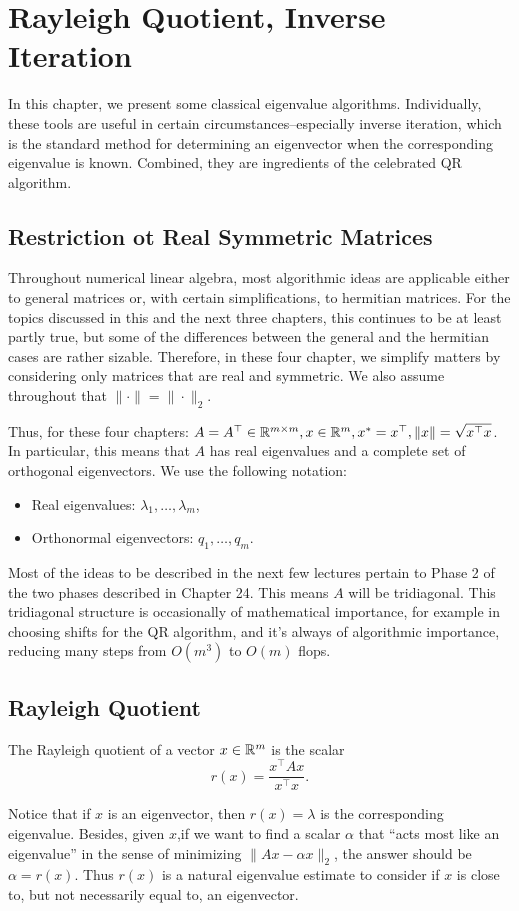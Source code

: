 \chapter{Rayleigh Quotient, Inverse Iteration}
In this chapter, we present some classical eigenvalue algorithms. Individually, these tools are useful in certain circumstances--especially inverse iteration, which is the standard method for determining an eigenvector when the corresponding eigenvalue is known. Combined, they are ingredients of the celebrated QR algorithm. 

\section{Restriction ot Real Symmetric Matrices}
Throughout numerical linear algebra, most algorithmic ideas are applicable either to general matrices or, with certain simplifications, to hermitian matrices. For the topics discussed in this and the next three chapters, this continues to be at least partly true, but some of the differences between the general and the hermitian cases are rather sizable. Therefore, in these four chapter, we simplify matters by considering only matrices that are real and symmetric. We also assume throughout that $\|\cdot \| = \|\cdot\|_2$.  

Thus, for these four chapters: $A= A^\top \in \mathbb{R}^{m\times m}, x\in \mathbb{R}^m, x^*  = x^\top , \|x\| =\sqrt{x^\top x} $. In particular, this means that $A$ has real eigenvalues and a complete set of orthogonal eigenvectors. We use the following notation: 
\begin{itemize}
    \item Real eigenvalues: $ \lambda _1, \ldots , \lambda _m $, 
    \item Orthonormal eigenvectors: $ q_1, \ldots ,q_m $.  
\end{itemize}
Most of the ideas to be described in the next few lectures pertain to Phase 2 of the two phases described in Chapter 24. This means $A$ will be tridiagonal. This tridiagonal structure is occasionally of mathematical importance, for example in choosing shifts for the QR algorithm, and it's always of algorithmic importance, reducing many steps from $O(m^3)$ to $O(m)$ flops. 

\section{Rayleigh Quotient}

\begin{definition}
\label{def: Rayleigh quotient}
The Rayleigh quotient of a vector $x\in \mathbb{R}^m$ is the scalar 
\[
r(x)  = \frac{x^\top Ax}{x^\top x}.  
\] 
\end{definition}
Notice that if $x$ is an eigenvector, then $r(x) = \lambda $ is the corresponding eigenvalue. Besides, given $x$,if we want to find a scalar $\alpha $ that ``acts most like an eigenvalue'' in the sense of minimizing $\|Ax- \alpha x\|_2$, the answer should be $\alpha = r(x)$. Thus $r(x)$ is a natural eigenvalue estimate to consider if $x$ is close to, but not necessarily equal to, an eigenvector. 

